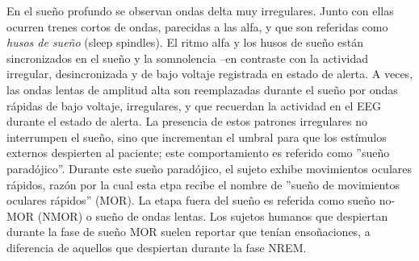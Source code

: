 \documentclass[12pt,a4paper]{mitthesis}
\begin{document}
En el sue\~no profundo se observan ondas delta muy irregulares. Junto con ellas ocurren trenes 
cortos de ondas, parecidas a las alfa, y que son referidas como \textit{husos de sue\~no} (sleep 
spindles). El ritmo alfa y los husos de sue\~no est\'an sincronizados en el sue\~no y la somnolencia 
--en contraste con la actividad irregular, desincronizada y de bajo voltaje registrada en estado de 
alerta.
A veces, las ondas lentas de amplitud alta son reemplazadas durante el sue\~no por ondas r\'apidas 
de bajo voltaje, irregulares, y que recuerdan la actividad en el EEG durante el estado de alerta.
La presencia de estos patrones irregulares no interrumpen el sue\~no, sino que incrementan el 
umbral para que los est\'imulos externos despierten al paciente; 
este comportamiento es referido como ''sue\~no parad\'ojico''.
Durante este sue\~no parad\'ojico, el sujeto exhibe movimientos oculares r\'apidos, raz\'on por la 
cual esta etpa recibe el nombre de ''sue\~no de movimientos oculares r\'apidos'' (MOR).
La etapa fuera del sue\~no
es referida como sue\~no no-MOR (NMOR) o sue\~no de ondas lentas.
Los sujetos humanos que despiertan durante la fase de sue\~no MOR suelen reportar que
ten\'ian enso\~naciones, a diferencia de aquellos que despiertan durante la fase NREM.





\end{document}
